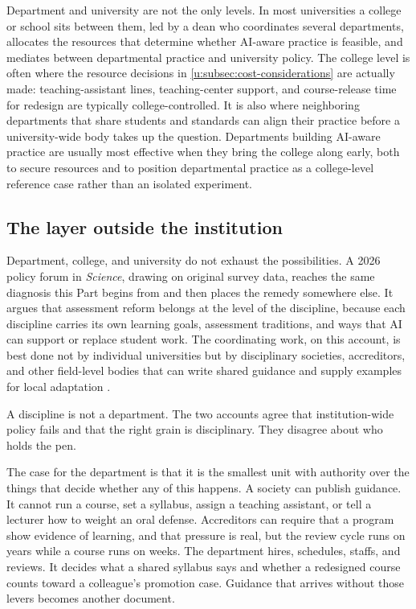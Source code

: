 \documentclass{SIAMbook2023}
\begin{document}
Department and university are not the only levels. In most universities a college or school sits between them, led by a dean who coordinates several departments, allocates the resources that determine whether AI-aware practice is feasible, and mediates between departmental practice and university policy. The college level is often where the resource decisions in \cref{u:subsec:cost-considerations} are actually made: teaching-assistant lines, teaching-center support, and course-release time for redesign are typically college-controlled. It is also where neighboring departments that share students and standards can align their practice before a university-wide body takes up the question. Departments building AI-aware practice are usually most effective when they bring the college along early, both to secure resources and to position departmental practice as a college-level reference case rather than an isolated experiment.

\subsection{The layer outside the institution}
\label{u:subsec:beyond-institution}%

Department, college, and university do not exhaust the possibilities. A 2026 policy forum in \emph{Science}, drawing on original survey data, reaches the same diagnosis this Part begins from and then places the remedy somewhere else. It argues that assessment reform belongs at the level of the discipline, because each discipline carries its own learning goals, assessment traditions, and ways that AI can support or replace student work. The coordinating work, on this account, is best done not by individual universities but by disciplinary societies, accreditors, and other field-level bodies that can write shared guidance and supply examples for local adaptation \citep{chirikov2026generative}.

A discipline is not a department. The two accounts agree that institution-wide policy fails and that the right grain is disciplinary. They disagree about who holds the pen.

The case for the department is that it is the smallest unit with authority over the things that decide whether any of this happens. A society can publish guidance. It cannot run a course, set a syllabus, assign a teaching assistant, or tell a lecturer how to weight an oral defense. Accreditors can require that a program show evidence of learning, and that pressure is real, but the review cycle runs on years while a course runs on weeks. The department hires, schedules, staffs, and reviews. It decides what a shared syllabus says and whether a redesigned course counts toward a colleague's promotion case. Guidance that arrives without those levers becomes another document.
\end{document}
